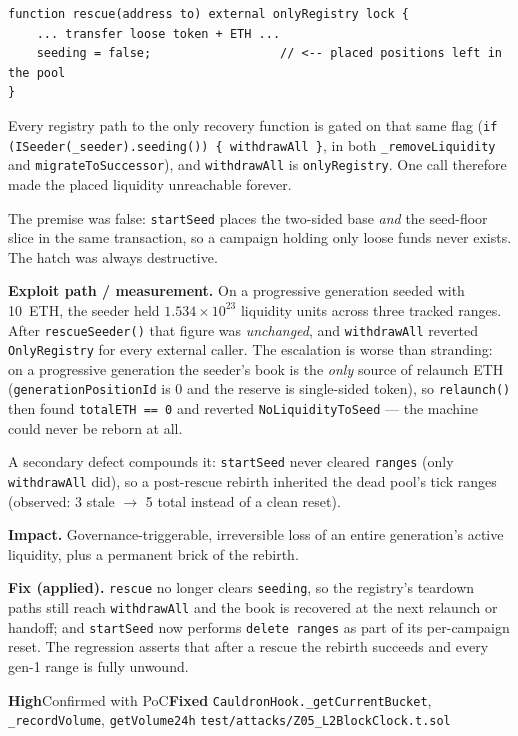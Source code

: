 \documentclass[10pt,a4paper]{article}
\newcommand{\sev}[2]{\textcolor{#1}{\textbf{#2}}}
\newcommand{\SevHigh}{\sev{high}{High}}
\newcommand{\Fixed}{\textcolor{ok}{\textbf{Fixed}}}
\newcommand{\code}[1]{\texttt{\small #1}}
\begin{document}
\begin{lstlisting}
function rescue(address to) external onlyRegistry lock {
    ... transfer loose token + ETH ...
    seeding = false;                  // <-- placed positions left in the pool
}
\end{lstlisting}

Every registry path to the only recovery function is gated on that same flag
(\code{if (ISeeder(\_seeder).seeding()) \{ withdrawAll \}}, in both
\code{\_removeLiquidity} and \code{migrateToSuccessor}), and \code{withdrawAll} is
\code{onlyRegistry}. One call therefore made the placed liquidity unreachable forever.

The premise was false: \code{startSeed} places the two-sided base \emph{and} the seed-floor
slice in the same transaction, so a campaign holding only loose funds never exists. The
hatch was always destructive.

\textbf{Exploit path / measurement.} On a progressive generation seeded with 10~ETH, the
seeder held $1.534\times10^{23}$ liquidity units across three tracked ranges. After
\code{rescueSeeder()} that figure was \emph{unchanged}, and \code{withdrawAll} reverted
\code{OnlyRegistry} for every external caller. The escalation is worse than stranding: on a
progressive generation the seeder's book is the \emph{only} source of relaunch ETH
(\code{generationPositionId} is 0 and the reserve is single-sided token), so
\code{relaunch()} then found \code{totalETH == 0} and reverted \code{NoLiquidityToSeed}
--- the machine could never be reborn at all.

A secondary defect compounds it: \code{startSeed} never cleared \code{ranges} (only
\code{withdrawAll} did), so a post-rescue rebirth inherited the dead pool's tick ranges
(observed: 3 stale $\to$ 5 total instead of a clean reset).

\textbf{Impact.} Governance-triggerable, irreversible loss of an entire generation's active
liquidity, plus a permanent brick of the rebirth.

\textbf{Fix (applied).} \code{rescue} no longer clears \code{seeding}, so the registry's
teardown paths still reach \code{withdrawAll} and the book is recovered at the next
relaunch or handoff; and \code{startSeed} now performs \code{delete ranges} as part of its
per-campaign reset. The regression asserts that after a rescue the rebirth succeeds and
every gen-1 range is fully unwound.

{\SevHigh}{Confirmed with PoC}{\Fixed}
{\code{CauldronHook.\_getCurrentBucket}, \code{\_recordVolume}, \code{getVolume24h}}
{\code{test/attacks/Z05\_L2BlockClock.t.sol}}
\end{document}
